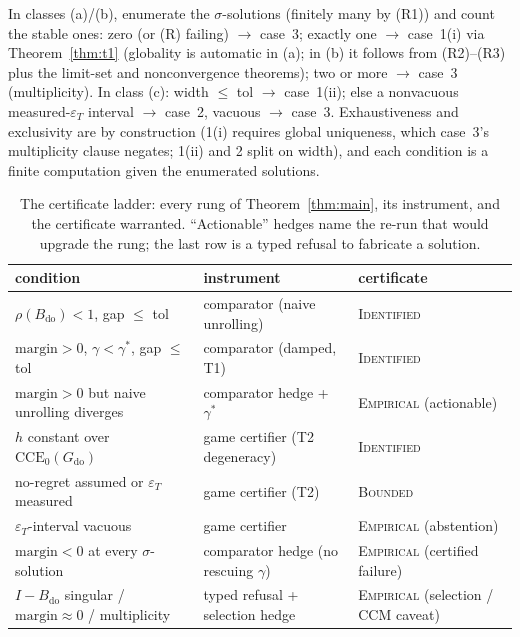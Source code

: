 \documentclass[pmlr]{jmlr}
\renewenvironment{proof}[1][\proofname]%
  {\par\noindent{\bfseries\upshape #1.\ }}{\jmlrQED}
\newcommand{\doop}{\mathrm{do}}
\newcommand{\CCE}{\mathrm{CCE}}
\newcommand{\margin}{\mathrm{margin}}
\newcommand{\gstar}{\gamma^{*}}
\newcommand{\Cid}{\textsc{Identified}}
\newcommand{\Cbd}{\textsc{Bounded}}
\newcommand{\Cem}{\textsc{Empirical}}
\begin{document}
\begin{proof}[Proof sketch (details in Appendix~\ref{app:main})]
In classes (a)/(b), enumerate the $\sigma$-solutions (finitely many by (R1)) and count the
stable ones: zero (or (R) failing) $\to$ case~3; exactly one $\to$ case~1(i) via
Theorem~\ref{thm:t1} (globality is automatic in (a); in (b) it follows from (R2)--(R3) plus the
limit-set and nonconvergence theorems); two or more $\to$ case~3 (multiplicity). In class (c):
width $\leq$ tol $\to$ case~1(ii); else a nonvacuous measured-$\varepsilon_T$ interval $\to$
case~2, vacuous $\to$ case~3. Exhaustiveness and exclusivity are by construction (1(i) requires
global uniqueness, which case~3's multiplicity clause negates; 1(ii) and 2 split on width), and
each condition is a finite computation given the enumerated solutions.
\end{proof}

\begin{table}[t]
\centering
\small
\begin{tabular}{lll}
\toprule
condition & instrument & certificate \\
\midrule
$\rho(B_{\doop}) < 1$, gap $\leq$ tol & comparator (naive unrolling) & \Cid \\
$\margin > 0$, $\gamma < \gstar$, gap $\leq$ tol & comparator (damped, T1) & \Cid \\
$\margin > 0$ but naive unrolling diverges & comparator hedge + $\gstar$ & \Cem{} (actionable) \\
$h$ constant over $\CCE_0(G_{\doop})$ & game certifier (T2 degeneracy) & \Cid \\
no-regret assumed or $\varepsilon_T$ measured & game certifier (T2) & \Cbd \\
$\varepsilon_T$-interval vacuous & game certifier & \Cem{} (abstention) \\
$\margin < 0$ at every $\sigma$-solution & comparator hedge (no rescuing $\gamma$) & \Cem{} (certified failure) \\
$I - B_{\doop}$ singular / $\margin \approx 0$ / multiplicity & typed refusal + selection hedge & \Cem{} (selection / CCM caveat) \\
\bottomrule
\end{tabular}
\caption{The certificate ladder: every rung of Theorem~\ref{thm:main}, its instrument, and the
certificate warranted. ``Actionable'' hedges name the re-run that would upgrade the rung; the
last row is a typed refusal to fabricate a solution.}
\label{tab:ladder}
\end{table}
\end{document}
